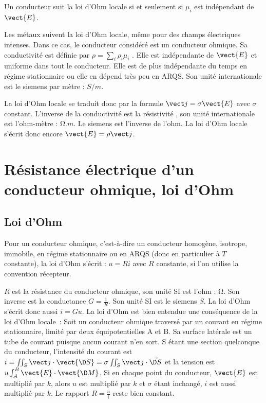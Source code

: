Un conducteur suit la  loi d'Ohm locale si et seulement si $\mu_i$  est indépendant de $\vect{E}$.

Les métaux suivent la loi d'Ohm locale, même pour des champs électriques intenses. Dans ce cas, le conducteur considéré est un conducteur ohmique. Sa conductivité est définie par $\rho = \sum_i \rho_i \mu_i$ . Elle est indépendante de $\vect{E}$ et uniforme dans tout le conducteur. Elle est de plus indépendante du temps en régime stationnaire ou elle en dépend très peu en ARQS. Son unité internationale est le siemens par mètre : $\si{S/m}$.

La loi d'Ohm locale se traduit donc par la formule $\vj = \sigma \vect{E}$ avec $\sigma$ constant. L'inverse de la conductivité est la résistivité , son unité internationale est l'ohm-mètre : $\si{\ohm.m}$. Le siemens est l'inverse de l'ohm. La loi d'Ohm locale s'écrit donc encore $\vect{E} = \rho \vj$.

\section{Résistance électrique d'un conducteur ohmique, loi d'Ohm}
\label{chap10-sec:resistanceelectrique}

\subsection{Loi d'Ohm}
\label{chap10-subsec:loidohm}

Pour un conducteur ohmique, c'est-à-dire un conducteur homogène, isotrope, immobile, en régime stationnaire ou en ARQS (donc en particulier à $T$ constante), la loi d'Ohm s'écrit : $u = R i$ avec $R$ constante, si l'on utilise la convention récepteur. 

$R$ est la résistance du conducteur ohmique, son unité SI est l'ohm : $\si{\ohm}$. Son inverse est la conductance $G=\frac{1}{R}$. Son unité SI est le siemens $\si{S}$. La loi d'Ohm s'écrit donc aussi $i = G u$. La loi d'Ohm est bien entendue une conséquence de la loi d'Ohm locale~: Soit un conducteur ohmique traversé par un courant en régime stationnaire, limité par deux équipotentielles A et B. Sa surface latérale est un tube de courant puisque aucun courant n'en sort. S étant une section quelconque du conducteur, l'intensité du courant est $ i = \iint_{S} \vj \cdot \vect{\D S} = \sigma \iint_S \vj \cdot \vec{\D S}$ et la tension est $u \int_A^B \vect{E} \cdot \vect{\D M}$. Si en chaque point du conducteur, $\vect{E}$ est multiplié par $k$, alors $u$ est multiplié par $k$ et $\sigma$ étant inchangé, $i$ est aussi multiplié par $k$. Le rapport $R = \frac{u}{i}$ reste bien constant.

